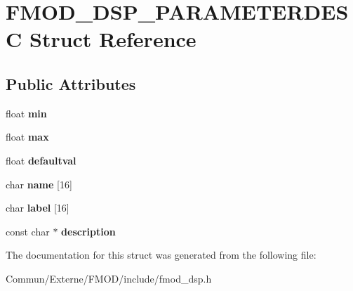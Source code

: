\hypertarget{struct_f_m_o_d___d_s_p___p_a_r_a_m_e_t_e_r_d_e_s_c}{}\section{F\+M\+O\+D\+\_\+\+D\+S\+P\+\_\+\+P\+A\+R\+A\+M\+E\+T\+E\+R\+D\+E\+SC Struct Reference}
\label{struct_f_m_o_d___d_s_p___p_a_r_a_m_e_t_e_r_d_e_s_c}
\subsection*{Public Attributes}
\begin{DoxyCompactItemize}
\item 
float {\bfseries min}\hypertarget{struct_f_m_o_d___d_s_p___p_a_r_a_m_e_t_e_r_d_e_s_c_a6a70d0988ed0a13192f2d2beb2bd5595}{}\label{struct_f_m_o_d___d_s_p___p_a_r_a_m_e_t_e_r_d_e_s_c_a6a70d0988ed0a13192f2d2beb2bd5595}

\item 
float {\bfseries max}\hypertarget{struct_f_m_o_d___d_s_p___p_a_r_a_m_e_t_e_r_d_e_s_c_aabb0d4e04d947e9830378115e3085402}{}\label{struct_f_m_o_d___d_s_p___p_a_r_a_m_e_t_e_r_d_e_s_c_aabb0d4e04d947e9830378115e3085402}

\item 
float {\bfseries defaultval}\hypertarget{struct_f_m_o_d___d_s_p___p_a_r_a_m_e_t_e_r_d_e_s_c_a9f47edb0a65cceaa81dd3cc77a272734}{}\label{struct_f_m_o_d___d_s_p___p_a_r_a_m_e_t_e_r_d_e_s_c_a9f47edb0a65cceaa81dd3cc77a272734}

\item 
char {\bfseries name} \mbox{[}16\mbox{]}\hypertarget{struct_f_m_o_d___d_s_p___p_a_r_a_m_e_t_e_r_d_e_s_c_a1619c32ff0267079429a9fa4c76f5745}{}\label{struct_f_m_o_d___d_s_p___p_a_r_a_m_e_t_e_r_d_e_s_c_a1619c32ff0267079429a9fa4c76f5745}

\item 
char {\bfseries label} \mbox{[}16\mbox{]}\hypertarget{struct_f_m_o_d___d_s_p___p_a_r_a_m_e_t_e_r_d_e_s_c_a989bbcd725bbe64d8ec330be19037d78}{}\label{struct_f_m_o_d___d_s_p___p_a_r_a_m_e_t_e_r_d_e_s_c_a989bbcd725bbe64d8ec330be19037d78}

\item 
const char $\ast$ {\bfseries description}\hypertarget{struct_f_m_o_d___d_s_p___p_a_r_a_m_e_t_e_r_d_e_s_c_aff99d44f94a9bcded22e7a24a8976f41}{}\label{struct_f_m_o_d___d_s_p___p_a_r_a_m_e_t_e_r_d_e_s_c_aff99d44f94a9bcded22e7a24a8976f41}

\end{DoxyCompactItemize}


The documentation for this struct was generated from the following file\+:\begin{DoxyCompactItemize}
\item 
Commun/\+Externe/\+F\+M\+O\+D/include/fmod\+\_\+dsp.\+h\end{DoxyCompactItemize}
